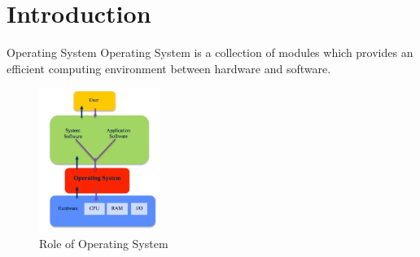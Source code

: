 \documentclass{beamer}
\begin{document}
\section[Introduction]{Introduction}


\begin{frame}{Operating System}
    Operating System is a collection of modules which provides an efficient computing environment between hardware and software.
    
 \begin{figure}[h]
     \includegraphics[width=0.35\textwidth , height=0.5\textheight]{abc}
     \caption{Role of Operating System}
     \label{fig:enter-label}
 \end{figure}
  
\end{frame}
\end{document}
